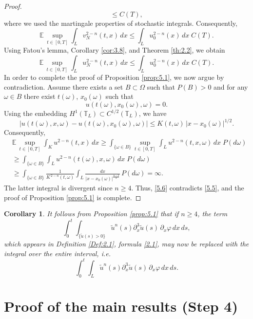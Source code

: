 \documentclass[a4paper,12pt]{article}
\newtheorem{corollary}[definition]{Corollary}
\numberwithin{equation}{section}
\def\T{\mathbb{T}_L}
\begin{document}
\begin{proof}
\[\le C(T),
\]
where we used the martingale properties of stochastic integrals.
Consequently,
\[
\mathbb{E}\,\sup_{t\in[0,T]}
\int_{L} v_N^{2-n}(t,x)\,dx
\le
\int_{L} u_0^{2-n}(x)\,dx \; C(T).
\]
Using Fatou's lemma, Corollary \ref{cor:3.8}, and Theorem \ref{th:2.2}, we obtain
\begin{equation}\label{5.5}
\mathbb{E}\,\sup_{t\in[0,T]}
\int_{L} u_N^{2-n}(t,x)\,dx
\le
\int_{L} u_0^{2-n}(x)\,dx \; C(T).
\end{equation}
In order to complete the proof of Proposition \ref{prop:5.1}, we now argue by contradiction. Assume there exists a set $B \subset \Omega$ such that $P(B)>0$ and
for any $\omega\in B$ there exist $t(\omega)$, $x_0(\omega)$ such that
\[
u(t(\omega),x_0(\omega),\omega)=0.
\]
Using the embedding $H^1(\T) \subset C^{1/2}(\T)$, %
we have
\[
|u(t(\omega),x,\omega) - u(t(\omega),x_0(\omega),\omega)|
\le
K(t,\omega)\,|x-x_0(\omega)|^{1/2}.
\]
Consequently, 
\begin{align}\label{5.6}
 \nonumber &  \mathbb{E}\,\sup_{t\in[0,T]}
\int_{K} u^{2-n}(t,x)\,dx
\ge
\int_{\{\omega\in B\}}
\sup_{t\in[0,T]}
\int_{L} u^{2-n}(t,x,\omega)\,dx \; P(d\omega) \\
& \ge \int_{\{\omega\in B\}}
\int_{L} u^{2-n}(t(\omega),x,\omega)\,dx \; P(d\omega) \\
\nonumber & \ge
\int_{\{\omega\in B\}}
\frac{1}{K^{\,2-n}(t,\omega)}
\int_{L}
\frac{dx}{|x-x_0(\omega)|^{\frac{n-2}{2}}}
\,P(d\omega)
= \infty.
\end{align}
The latter integral is divergent since $n \ge 4$. Thus, \eqref{5.6} contradicts   \eqref{5.5}, and the proof of Proposition \ref{prop:5.1} is complete.
\end{proof}
\medskip

\begin{corollary} \label{cor:5.2}
It follows from Proposition \ref{prop:5.1} that if $n\ge 4$, the term
\[
\int_0^t \int_{\{\tilde{u}(s)>0\}}
\tilde{u}^n(s) \partial_x^3 \tilde{u}(s)\,\partial_x \varphi \, dx\,ds,
\]
which appears in Definition \ref{Def:2.1}, formula \eqref{2.1}, may now be replaced with the integral over the entire interval, i.e.
\[
\int_0^t \int_{L}
\tilde{u}^n(s) \partial_x^3 \tilde{u}(s)\,\partial_x \varphi \, dx\,ds.
\]
\end{corollary}

\section{Proof of the main results (Step 4)} \label{Sec 6}
\end{document}
